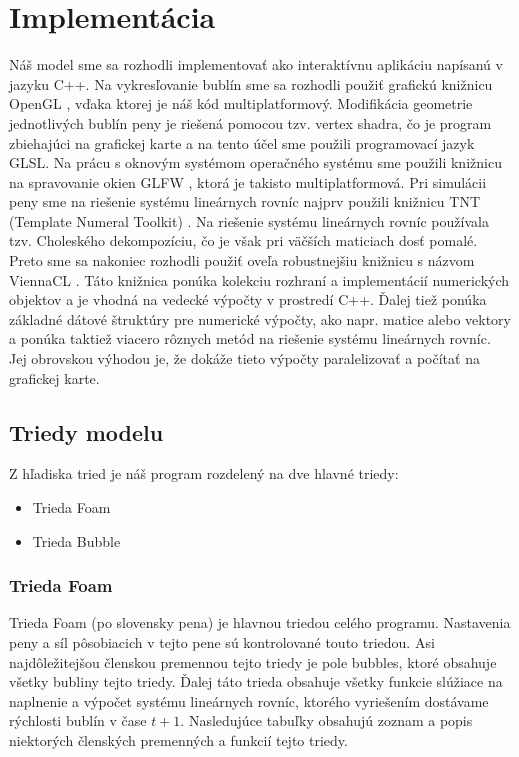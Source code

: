 \chapter{Implementácia}\label{chap:implementation}

Náš model sme sa rozhodli implementovať ako interaktívnu aplikáciu napísanú v jazyku C++. Na vykresľovanie bublín sme sa rozhodli použiť grafickú knižnicu OpenGL \cite{opengl}, vďaka ktorej je náš kód multiplatformový. Modifikácia geometrie jednotlivých bublín peny je riešená pomocou tzv. vertex shadra, čo je program zbiehajúci na grafickej karte a na tento účel sme použili programovací jazyk GLSL. Na prácu s oknovým systémom operačného systému sme použili knižnicu na spravovanie okien GLFW \cite{glfw}, ktorá je takisto multiplatformová. Pri simulácii peny sme na riešenie systému lineárnych rovníc najprv použili knižnicu TNT (Template Numeral Toolkit) \cite{tnt}. Na riešenie systému lineárnych rovníc používala tzv. Choleského dekompozíciu, čo je však pri väčších maticiach dosť pomalé. Preto sme sa nakoniec rozhodli použiť oveľa robustnejšiu knižnicu s názvom ViennaCL \cite{viennacl}. Táto knižnica ponúka kolekciu rozhraní a implementácií numerických objektov a je vhodná na vedecké výpočty v prostredí C++. Ďalej tiež ponúka základné dátové štruktúry pre numerické výpočty, ako napr. matice alebo vektory a ponúka taktiež viacero rôznych metód na riešenie systému lineárnych rovníc. Jej obrovskou výhodou je, že dokáže tieto výpočty paralelizovať a počítať na grafickej karte.

\section{Triedy modelu}
	
Z hľadiska tried je náš program rozdelený na dve hlavné triedy:
\begin{itemize}
	\item Trieda Foam
	\item Trieda Bubble
\end{itemize}

\subsection{Trieda Foam}

Trieda Foam (po slovensky pena) je hlavnou triedou celého programu. Nastavenia peny a síl pôsobiacich v tejto pene sú kontrolované touto triedou. Asi najdôležitejšou členskou premennou tejto triedy je pole bubbles, ktoré obsahuje všetky bubliny tejto triedy. Ďalej táto trieda obsahuje všetky funkcie slúžiace na naplnenie a výpočet systému lineárnych rovníc, ktorého vyriešením dostávame rýchlosti bublín v čase $t + 1$. Nasledujúce tabuľky obsahujú zoznam a popis niektorých členských premenných a funkcií tejto triedy.

